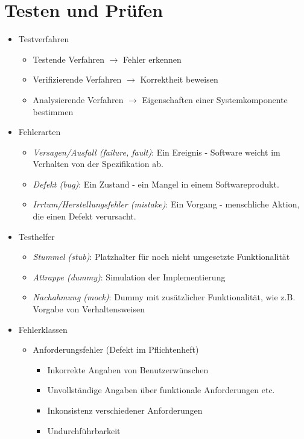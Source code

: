 \documentclass{article}
\begin{document}
\section{Testen und Prüfen}
\begin{itemize}
  \item Testverfahren
  \begin{itemize}
    \item Testende Verfahren $\to$ Fehler erkennen
    \item Verifizierende Verfahren $\to$ Korrektheit beweisen
    \item Analysierende Verfahren $\to$ Eigenschaften einer Systemkomponente bestimmen
  \end{itemize}
  \item Fehlerarten
  \begin{itemize}
    \item \textit{Versagen/Ausfall (failure, fault)}: Ein Ereignis - Software weicht im Verhalten von der Spezifikation ab.
    \item \textit{Defekt (bug)}: Ein Zustand - ein Mangel in einem Softwareprodukt.
    \item \textit{Irrtum/Herstellungsfehler (mistake)}: Ein Vorgang - menschliche Aktion, die einen Defekt verursacht.
  \end{itemize}
  \item Testhelfer
  \begin{itemize}
    \item \textit{Stummel (stub)}: Platzhalter für noch nicht umgesetzte Funktionalität
    \item \textit{Attrappe (dummy)}: Simulation der Implementierung
    \item \textit{Nachahmung (mock)}: Dummy mit zusätzlicher Funktionalität, wie z.B. Vorgabe von Verhaltensweisen
  \end{itemize}
  \item Fehlerklassen
  \begin{itemize}
    \item Anforderungsfehler (Defekt im Pflichtenheft)
    \begin{itemize}
      \item Inkorrekte Angaben von Benutzerwünschen
      \item Unvollständige Angaben über funktionale Anforderungen etc.
      \item Inkonsistenz verschiedener Anforderungen
      \item Undurchführbarkeit
    \end{itemize}

\end{itemize}
\end{itemize}
\end{document}
